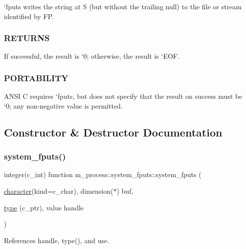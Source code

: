 `fputs\textquotesingle{} writes the string at S (but without the trailing null) to the file or stream identified by FP. \subsubsection*{R\+E\+T\+U\+R\+NS}

If successful, the result is `0\textquotesingle{}; otherwise, the result is `\+E\+OF\textquotesingle{}. \subsubsection*{P\+O\+R\+T\+A\+B\+I\+L\+I\+TY}

A\+N\+SI C requires `fputs\textquotesingle{}, but does not specify that the result on success must be `0\textquotesingle{}; any non-\/negative value is permitted. 

\subsection{Constructor \& Destructor Documentation}
\mbox{\label{interfacem__process_1_1system__fputs_a0a084cac4baf5058a79af7f6490c3a89}} 
\subsubsection{\texorpdfstring{system\+\_\+fputs()}{system\_fputs()}}
{\footnotesize\ttfamily integer(c\+\_\+int) function m\+\_\+process\+::system\+\_\+fputs\+::system\+\_\+fputs (\begin{DoxyParamCaption}\item[{\hyperlink{option__stopwatch_83_8txt_abd4b21fbbd175834027b5224bfe97e66}{character}(kind=c\+\_\+char), dimension($\ast$)}]{buf,  }\item[{\hyperlink{stop__watch_83_8txt_a70f0ead91c32e25323c03265aa302c1c}{type} (c\+\_\+ptr), value}]{handle }\end{DoxyParamCaption})\hspace{0.3cm}{\ttfamily [private]}}



References handle, type(), and use.

